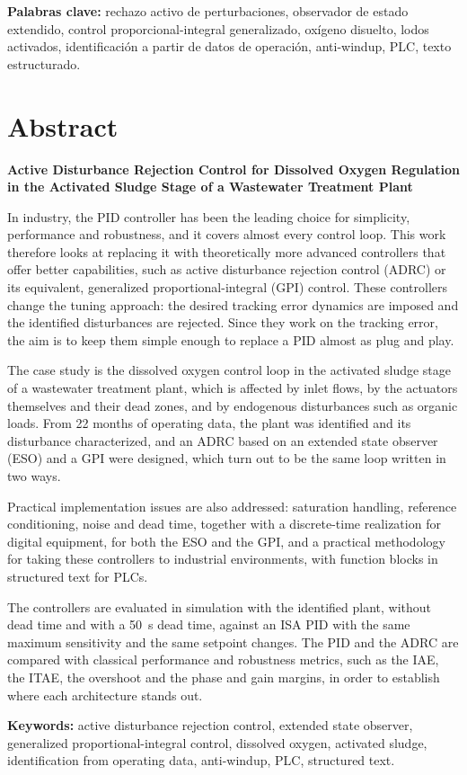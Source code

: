 \vspace{0.4cm}
\noindent
\textbf{Palabras clave:} rechazo activo de perturbaciones, observador de estado
extendido, control proporcional-integral generalizado, oxígeno disuelto, lodos
activados, identificación a partir de datos de operación, anti-windup,
PLC, texto estructurado.

\chapter*{Abstract}

\noindent
\textbf{Active Disturbance Rejection Control for Dissolved Oxygen Regulation in
the Activated Sludge Stage of a Wastewater Treatment Plant}

\vspace{0.3cm}
\noindent
In industry, the PID controller has been the leading choice for simplicity, performance and
robustness, and it covers almost every control loop. This work therefore looks at replacing it with
theoretically more advanced controllers that offer better capabilities, such as active disturbance
rejection control (ADRC) or its equivalent, generalized proportional-integral (GPI) control. These
controllers change the tuning approach: the desired tracking error dynamics are imposed and the
identified disturbances are rejected. Since they work on the tracking error, the aim is to keep them
simple enough to replace a PID almost as plug and play.

The case study is the dissolved oxygen control loop in the activated sludge stage of a wastewater
treatment plant, which is affected by inlet flows, by the actuators themselves and their dead zones,
and by endogenous disturbances such as organic loads. From 22 months of operating data, the plant was
identified and its disturbance characterized, and an ADRC based on an extended state observer (ESO)
and a GPI were designed, which turn out to be the same loop written in two ways.

Practical implementation issues are also addressed: saturation handling, reference conditioning,
noise and dead time, together with a discrete-time realization for digital equipment, for both the
ESO and the GPI, and a practical methodology for taking these controllers to industrial environments,
with function blocks in structured text for PLCs.

The controllers are evaluated in simulation with the identified plant, without dead time and with a
50~s dead time, against an ISA PID with the same maximum sensitivity and the same setpoint changes.
The PID and the ADRC are compared with classical performance and robustness metrics, such as the IAE,
the ITAE, the overshoot and the phase and gain margins, in order to establish where each architecture
stands out.

\vspace{0.4cm}
\noindent
\textbf{Keywords:} active disturbance rejection control, extended state
observer, generalized proportional-integral control, dissolved oxygen,
activated sludge, identification from operating data, anti-windup, PLC,
structured text.
